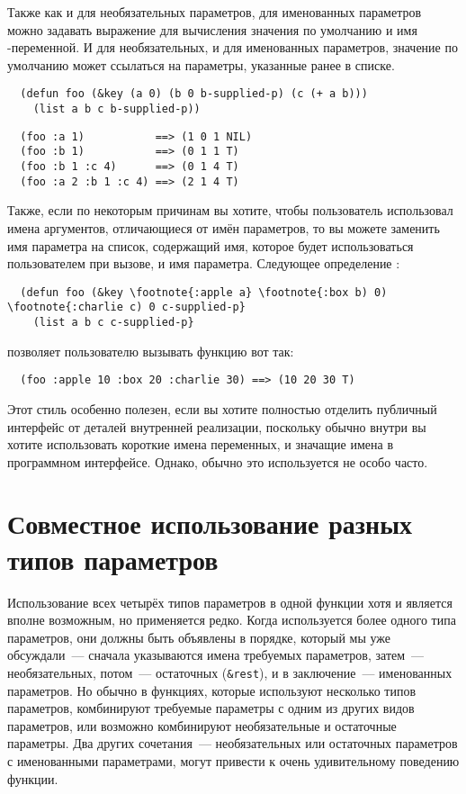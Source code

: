 Также как и для необязательных параметров, для именованных параметров можно задавать
выражение для вычисления значения по умолчанию и имя -переменной.  И для
необязательных, и для именованных параметров, значение по умолчанию может ссылаться на
параметры, указанные ранее в списке.

\begin{lstlisting}
  (defun foo (&key (a 0) (b 0 b-supplied-p) (c (+ a b)))
    (list a b c b-supplied-p))
\end{lstlisting}
  
\begin{verbatim}
  (foo :a 1)           ==> (1 0 1 NIL)
  (foo :b 1)           ==> (0 1 1 T)
  (foo :b 1 :c 4)      ==> (0 1 4 T)
  (foo :a 2 :b 1 :c 4) ==> (2 1 4 T)
\end{verbatim}

Также, если по некоторым причинам вы хотите, чтобы пользователь использовал имена
аргументов, отличающиеся от имён параметров, то вы можете заменить имя параметра на
список, содержащий имя, которое будет использоваться пользователем при вызове, и имя
параметра.  Следующее определение :

\begin{lstlisting}
  (defun foo (&key \footnote{:apple a} \footnote{:box b) 0) \footnote{:charlie c) 0 c-supplied-p}
    (list a b c c-supplied-p}
\end{lstlisting}

позволяет пользователю вызывать функцию вот так:

\begin{verbatim}
  (foo :apple 10 :box 20 :charlie 30) ==> (10 20 30 T)
\end{verbatim}

Этот стиль особенно полезен, если вы хотите полностью отделить публичный интерфейс от
деталей внутренней реализации, поскольку обычно внутри вы хотите использовать короткие
имена переменных, и значащие имена в программном интерфейсе.  Однако, обычно это
используется не особо часто.

\section{Совместное использование разных типов параметров}

Использование всех четырёх типов параметров в одной функции хотя и является вполне
возможным, но применяется редко.  Когда используется более одного типа параметров, они
должны быть объявлены в порядке, который мы уже обсуждали~--- сначала указываются имена
требуемых параметров, затем~--- необязательных, потом~--- остаточных (\lstinline!&rest!), и в
заключение~--- именованных параметров.  Но обычно в функциях, которые используют несколько
типов параметров, комбинируют требуемые параметры с одним из других видов параметров, или
возможно комбинируют необязательные и остаточные параметры.  Два других сочетания~---
необязательных или остаточных параметров с именованными параметрами, могут привести к
очень удивительному поведению функции.

